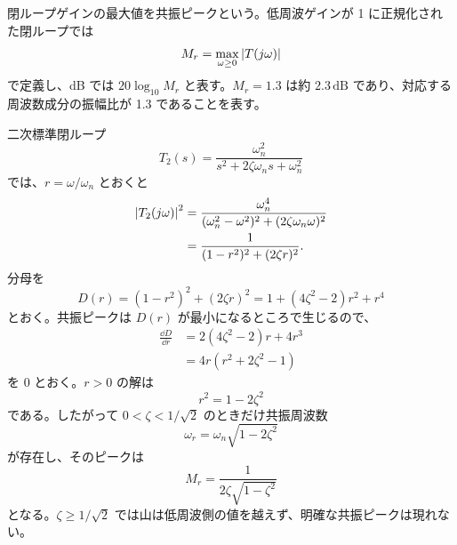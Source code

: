 閉ループゲインの最大値を共振ピークという。低周波ゲインが 1 に正規化された閉ループでは
\begin{equation}
  M_r=\max_{\omega\ge 0}\left|T(j\omega)\right|
\end{equation}
で定義し、dB では $20\log_{10}M_r$ と表す。$M_r=1.3$ は約 $2.3\,\mathrm{dB}$ であり、対応する周波数成分の振幅比が 1.3 であることを表す。

二次標準閉ループ
\begin{equation}
  T_2(s)=\frac{\omega_n^2}{s^2+2\zeta\omega_n s+\omega_n^2}
\end{equation}
では、$r=\omega/\omega_n$ とおくと
\begin{align}
  \left|T_2(j\omega)\right|^2
  &=\frac{\omega_n^4}{(\omega_n^2-\omega^2)^2+(2\zeta\omega_n\omega)^2}\\
  &=\frac{1}{(1-r^2)^2+(2\zeta r)^2}.
\end{align}
分母を
\begin{equation}
  D(r)=(1-r^2)^2+(2\zeta r)^2
  =1+(4\zeta^2-2)r^2+r^4
\end{equation}
とおく。共振ピークは $D(r)$ が最小になるところで生じるので、
\begin{align}
  \frac{\dd D}{\dd r}
  &=2(4\zeta^2-2)r+4r^3\\
  &=4r(r^2+2\zeta^2-1)
\end{align}
を 0 とおく。$r>0$ の解は
\begin{equation}
  r^2=1-2\zeta^2
\end{equation}
である。したがって $0<\zeta<1/\sqrt{2}$ のときだけ共振周波数
\begin{equation}
  \omega_r=\omega_n\sqrt{1-2\zeta^2}
\end{equation}
が存在し、そのピークは
\begin{equation}
  M_r=\frac{1}{2\zeta\sqrt{1-\zeta^2}}
\end{equation}
となる。$\zeta\ge 1/\sqrt{2}$ では山は低周波側の値を越えず、明確な共振ピークは現れない。

